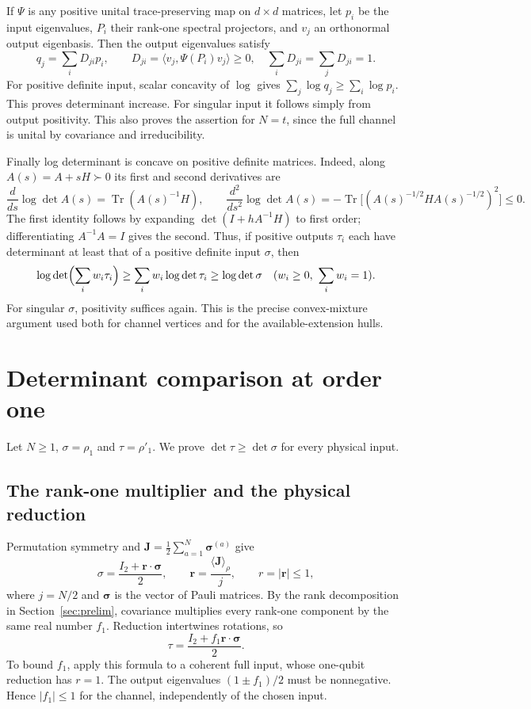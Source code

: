 \documentclass[11pt,a4paper]{article}
\begin{document}
If $\Psi$ is any positive unital trace-preserving map on $d\times d$
matrices, let $p_i$ be the input eigenvalues, $P_i$ their rank-one
spectral projectors, and $v_j$ an orthonormal output eigenbasis.
Then the output eigenvalues satisfy
\[
 q_j=\sum_iD_{ji}p_i,\qquad
 D_{ji}=\langle v_j,\Psi(P_i)v_j\rangle\ge0,
 \quad \sum_iD_{ji}=\sum_jD_{ji}=1.
\]
For positive definite input, scalar concavity of $\log$ gives
$\sum_j\log q_j\ge\sum_i\log p_i$. This proves determinant increase.
For singular input it follows simply from output positivity.
This also proves the assertion for $N=t$, since the full channel is
unital by covariance and irreducibility.

Finally log determinant is concave on positive definite matrices.
Indeed, along $A(s)=A+sH\succ0$ its first and second derivatives are
\[
 \frac{d}{ds}\log\det A(s)=\operatorname{Tr}(A(s)^{-1}H),\qquad
 \frac{d^2}{ds^2}\log\det A(s)
 =-\operatorname{Tr}\bigl[(A(s)^{-1/2}HA(s)^{-1/2})^2\bigr]\le0.
\]
The first identity follows by expanding $\det(I+hA^{-1}H)$ to first
order; differentiating $A^{-1}A=I$ gives the second.
Thus, if positive outputs $\tau_i$ each have determinant at least that
of a positive definite input $\sigma$, then
\[
 \log\det\Bigl(\sum_iw_i\tau_i\Bigr)
 \ge\sum_iw_i\log\det\tau_i\ge\log\det\sigma
 \quad(w_i\ge0,\ \sum_iw_i=1).
\]
For singular $\sigma$, positivity suffices again. This is the precise
convex-mixture argument used both for channel vertices and for the
available-extension hulls.

\clearpage
\section{Determinant comparison at order one}\label{sec:t1}
Let $N\ge1$, $\sigma=\rho_1$ and $\tau=\rho'_1$. We prove
$\det\tau\ge\det\sigma$ for every physical input.

\subsection{The rank-one multiplier and the physical reduction}
Permutation symmetry and
$\mathbf J=\tfrac12\sum_{a=1}^N\boldsymbol\sigma^{(a)}$ give
\[
 \sigma=\frac{I_2+\mathbf r\cdot\boldsymbol\sigma}{2},\qquad
 \mathbf r=\frac{\langle\mathbf J\rangle_\rho}{j},\qquad
 r=|\mathbf r|\le1,
\]
where $j=N/2$ and $\boldsymbol\sigma$ is the vector of Pauli matrices.
By the rank decomposition in Section~\ref{sec:prelim}, covariance
multiplies every rank-one component by the same real number $f_1$.
Reduction intertwines rotations, so
\[
 \tau=\frac{I_2+f_1\mathbf r\cdot\boldsymbol\sigma}{2}.
\]
To bound $f_1$, apply this formula to a coherent full input, whose
one-qubit reduction has $r=1$. The output eigenvalues
$(1\pm f_1)/2$ must be nonnegative. Hence $|f_1|\le1$ for the channel,
independently of the chosen input.
\end{document}
